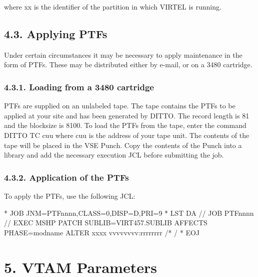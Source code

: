 \documentclass[letterpaper,10pt,english]{sphinxmanual}
\begin{document}
\begin{sphinxVerbatim}[commandchars=\\\{\}]
 
\end{sphinxVerbatim}

where xx is the identifier of the partition in which VIRTEL is running.


\section{4.3. Applying PTFs}
\label{\detokenize{Installation_Guide:id4}}
Under certain circumstances it may be necessary to apply maintenance in the form of PTFs. These may be distributed either by e-mail, or on a 3480 cartridge.


\subsection{4.3.1. Loading from a 3480 cartridge}
\label{\detokenize{Installation_Guide:loading-from-a-3480-cartridge}}
PTFs are supplied on an unlabeled tape. The tape contains the PTFs to be applied at your site and has been generated by DITTO. The record length is 81 and the blocksize is 8100. To load the PTFs from the tape, enter the command DITTO TC cuu where cuu is the address of your tape unit. The contents of the tape will be placed in the VSE Punch. Copy the contents of the Punch into a library and add the necessary execution JCL before submitting the job.


\subsection{4.3.2. Application of the PTFs}
\label{\detokenize{Installation_Guide:application-of-the-ptfs}}
To apply the PTFs, use the following JCL:

\begin{sphinxVerbatim}[commandchars=\\\{\}]
* \PYGZdl{}\PYGZdl{} JOB JNM=PTFnnnn,CLASS=0,DISP=D,PRI=9
* \PYGZdl{}\PYGZdl{} LST DA
// JOB PTFnnnn
// EXEC MSHP
  PATCH SUBLIB=VIRT457.SUBLIB
  AFFECTS PHASE=modname
  ALTER xxxx vvvvvvvv:rrrrrrrr
/*
/\PYGZam{}
* \PYGZdl{}\PYGZdl{} EOJ
\end{sphinxVerbatim}



\chapter{5. VTAM Parameters}
\label{\detokenize{Installation_Guide:vtam-parameters}}
\end{document}
